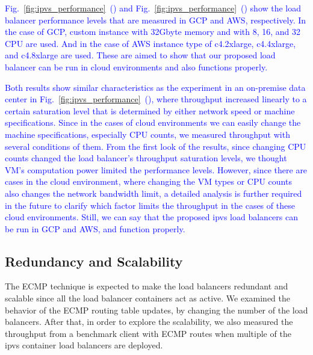 \textcolor{blue}{
Fig.~\ref{fig:ipvs_performance}~() and Fig.~\ref{fig:ipvs_performance}~() show the load balancer performance levels that are measured in GCP and AWS, respectively. In the case of GCP, custom instance with 32Gbyte memory and with 8, 16, and 32 CPU are used.
And in the case of AWS instance type of c4.2xlarge, c4.4xlarge, and c4.8xlarge are used.
These are aimed to show that our proposed load balancer can be run in cloud environments and also functions properly.
}

\textcolor{blue}{
Both results show similar characteristics as the experiment in an on-premise data center in Fig.~\ref{fig:ipvs_performance}~(), where throughput increased linearly to a certain saturation level that is determined by either network speed or machine specifications.
Since in the cases of cloud environments we can easily change the machine specifications, especially CPU counts, we measured throughput with several conditions of them.
From the first look of the results, since changing CPU counts changed the load balancer's throughput saturation levels, we thought VM's computation power limited the performance levels.
However, since there are cases in the cloud environment, where changing the VM types or CPU counts also changes the network bandwidth limit, a detailed analysis is further required in the future to clarify which factor limits the throughput in the cases of these cloud environments.
Still, we can say that the proposed ipvs load balancers can be run in GCP and AWS, and function properly.
}

\subsection{Redundancy and Scalability}

The ECMP technique is expected to make the load balancers redundant and scalable since all the load balancer containers act as active.
We examined the behavior of the ECMP routing table updates, by changing the number of the load balancers.
After that, in order to explore the scalability, we also measured the throughput from a benchmark client with ECMP routes when multiple of the ipvs container load balancers are deployed.

